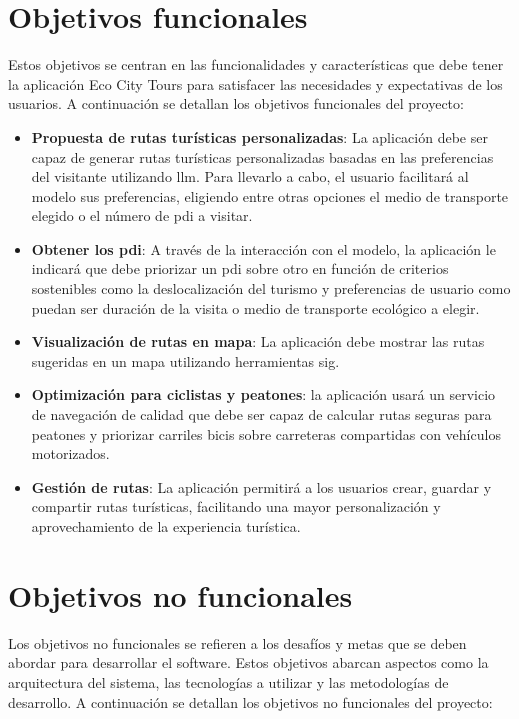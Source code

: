 
\section{Objetivos funcionales}

Estos objetivos se centran en las funcionalidades y características que debe tener la aplicación Eco City Tours para satisfacer las necesidades y expectativas de los usuarios. A continuación se detallan los objetivos funcionales del proyecto:

\begin{itemize}
    \item \textbf{Propuesta de rutas turísticas personalizadas}: La aplicación debe ser capaz de generar rutas turísticas personalizadas basadas en las preferencias del visitante utilizando \acrfull{llm}. Para llevarlo a cabo, el usuario facilitará al modelo sus preferencias, eligiendo entre otras opciones el medio de transporte elegido o el número de \acrfull{pdi} a visitar.
    \item \textbf{Obtener los \acrfull{pdi}}: A través de la interacción con el modelo, la aplicación le indicará que debe priorizar un \acrshort{pdi} sobre otro en función de criterios sostenibles como la deslocalización del turismo y preferencias de usuario como puedan ser duración de la visita o medio de transporte ecológico a elegir.
    \item \textbf{Visualización de rutas en mapa}: La aplicación debe mostrar las rutas sugeridas en un mapa utilizando herramientas \acrshort{sig}.
    \item \textbf{Optimización para ciclistas y peatones}: la aplicación usará un servicio de navegación de calidad que debe ser capaz de calcular rutas seguras para peatones y priorizar carriles bicis sobre carreteras compartidas con vehículos motorizados.
    \item \textbf{Gestión de rutas}: La aplicación permitirá a los usuarios crear, guardar y compartir rutas turísticas, facilitando una mayor personalización y aprovechamiento de la experiencia turística.
    

\end{itemize}

\section{Objetivos no funcionales}

Los objetivos no funcionales se refieren a los desafíos y metas que se deben abordar para desarrollar el software. Estos objetivos abarcan aspectos como la arquitectura del sistema, las tecnologías a utilizar y las metodologías de desarrollo. A continuación se detallan los objetivos no funcionales del proyecto:


